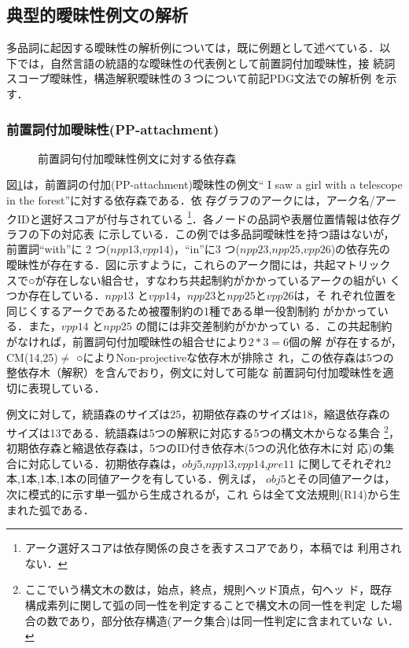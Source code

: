 \subsection{典型的曖昧性例文の解析}
多品詞に起因する曖昧性の解析例については，既に例題として述べている．以
下では，自然言語の統語的な曖昧性の代表例として前置詞付加曖昧性，接
続詞スコープ曖昧性，構造解釈曖昧性の３つについて前記PDG文法での解析例
を示す．

\subsubsection{前置詞付加曖昧性(PP-attachment)}\label{sec:PP-attachment}

\begin{figure}[b]
\begin{center}
\end{center}
\myfiglabelskip
\caption{前置詞句付加曖昧性例文に対する依存森}
\label{fig:DFForISaw}
\end{figure}

図\ref{fig:DFForISaw}は，前置詞の付加(PP-attachment)曖昧性の例文``
I saw a girl with a telescope in the forest''に対する依存森である．依
存グラフのアークには，アーク名/アークIDと選好スコアが付与されている
\footnote{アーク選好スコアは依存関係の良さを表すスコアであり，本稿では
利用されない．}．各ノードの品詞や表層位置情報は依存グラフの下の対応表
に示している．この例では多品詞曖昧性を持つ語はないが，前置詞``with''に
2 つ($npp13$,$vpp14$)，``in''に3 つ($npp23$,$npp25$,$vpp26$)の依存先の
曖昧性が存在する．図に示すように，これらのアーク間には，共起マトリック
スで○が存在しない組合せ，すなわち共起制約がかかっているアークの組がい
くつか存在している．$npp13$ と$vpp14$，$npp23$と$npp25$と$vpp26$は，そ
れぞれ位置を同じくするアークであるため被覆制約の1種である単一役割制約
がかかっている．また，$vpp14$ と$npp25$ の間には非交差制約がかかってい
る．この共起制約がなければ，前置詞句付加曖昧性の組合せにより$2*3=6$個の解
が存在するが，CM(14,25)${\neq}$ ○によりNon-projectiveな依存木が排除さ
れ，この依存森は5つの整依存木（解釈）を含んでおり，例文に対して可能な
前置詞句付加曖昧性を適切に表現している．

例文に対して，統語森のサイズは25，初期依存森のサイズは18，縮退依存森の
サイズは13である．統語森は5つの解釈に対応する5つの構文木からなる集合
\footnote {ここでいう構文木の数は，始点，終点，規則ヘッド頂点，句ヘッ
ド，既存構成素列に関して弧の同一性を判定することで構文木の同一性を判定
した場合の数であり，部分依存構造(アーク集合)は同一性判定に含まれていな
い．}，初期依存森と縮退依存森は，5つのID付き依存木(5つの汎化依存木に対
応)の集合に対応している．初期依存森は，$obj5$,$npp13$,$vpp14$,$pre11$ 
に関してそれぞれ2本,1本,1本,1本の同値アークを有している．例えば，
$obj5$とその同値アークは，次に模式的に示す単一弧から生成されるが，これ
らは全て文法規則(R14)から生まれた弧である．

